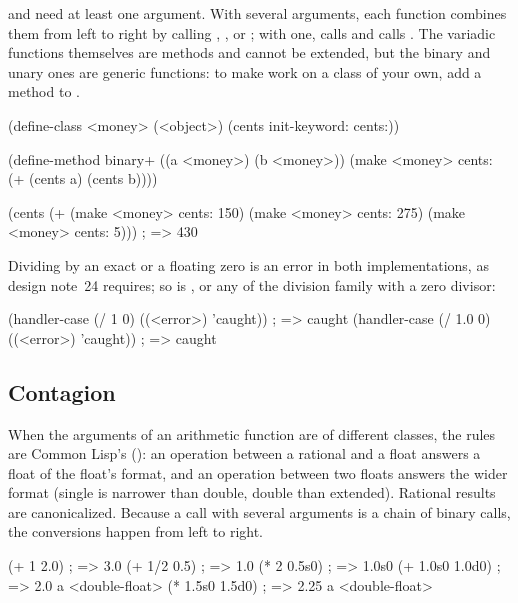\noindent \code{-} and \code{/} need at least one argument. With several
arguments, each function combines them from left to right by calling
, , 
or ; with one, \code{-} calls
 and \code{/} calls .
The variadic functions themselves are methods and cannot be extended,
but the binary and unary ones are generic functions: to make
\code{+} work on a class of your own, add a method to .

\begin{dylan}
(define-class <money> (<object>)
  (cents init-keyword: cents:))

(define-method binary+ ((a <money>) (b <money>))
  (make <money> cents: (+ (cents a) (cents b))))

(cents (+ (make <money> cents: 150)
          (make <money> cents: 275)
          (make <money> cents: 5)))      ; => 430
\end{dylan}

Dividing by an exact or a floating zero is an error in both
implementations, as design note~24 requires; so is ,
 or any of the division family with a zero divisor:

\begin{dylan}
(handler-case (/ 1 0)   ((<error>) 'caught))   ; => caught
(handler-case (/ 1.0 0) ((<error>) 'caught))   ; => caught
\end{dylan}

\subsection{Contagion}

When the arguments of an arithmetic function are of different classes,
the rules are Common Lisp's (): an operation
between a rational and a float answers a float of the float's format,
and an operation between two floats answers the wider format (single is
narrower than double, double than extended). Rational results are
canonicalized. Because a call with several arguments is a chain of
binary calls, the conversions happen from left to right.

\begin{dylan}
(+ 1 2.0)          ; => 3.0
(+ 1/2 0.5)        ; => 1.0
(* 2 0.5s0)        ; => 1.0s0
(+ 1.0s0 1.0d0)    ; => 2.0         a <double-float>
(* 1.5s0 1.5d0)    ; => 2.25        a <double-float>
\end{dylan}


